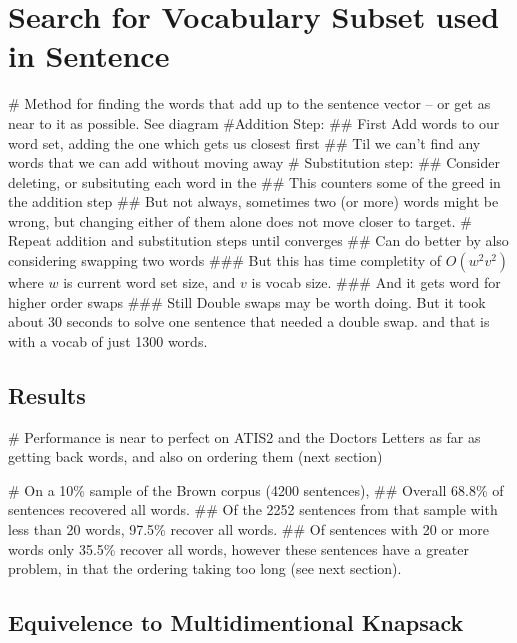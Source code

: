 \documentclass[]{scrartcl}
\begin{document}
\section{Search for Vocabulary Subset used in Sentence}



\begin{easylist}[itemize]
	# Method for finding the words that add up to the sentence vector -- or get as near to it as possible. See diagram
	#Addition Step:
	## First Add words to our word set, adding the one which gets us closest first
	## Til we can't find any words that we can add without moving away
	# Substitution step:
	## Consider deleting, or subsituting each word in the
	## This counters some of the greed in the addition step
	## But not always, sometimes two (or more) words might be wrong, but changing either of them alone does not move closer to target.
	# Repeat addition and substitution steps until converges
	## Can do better by also considering swapping two words
	### But this has time completity of $O(w^2 v^2)$ where $w$ is current word set size, and $v$ is vocab size.
	### And it gets word for higher order swaps
	### Still Double swaps may be worth doing. But it took about 30 seconds to solve one sentence that needed a double swap. and that is with a vocab of just 1300 words.
\end{easylist}

\subsection{Results}
\begin{easylist}[itemize]
	# Performance is near to perfect on ATIS2 and the Doctors Letters as far as getting back words, and also on ordering them (next section)
	
	# On a 10\% sample of the Brown corpus (4200 sentences),
	## Overall 68.8\% of sentences recovered all words.
	## Of the 2252 sentences from that sample with less than 20 words, 97.5\% recover all words. 
	## Of sentences with 20 or more words only 35.5\% recover all words, however these sentences have a greater problem, in that the ordering taking too long (see next section).
\end{easylist}

\subsection{Equivelence to Multidimentional Knapsack}
\end{document}

